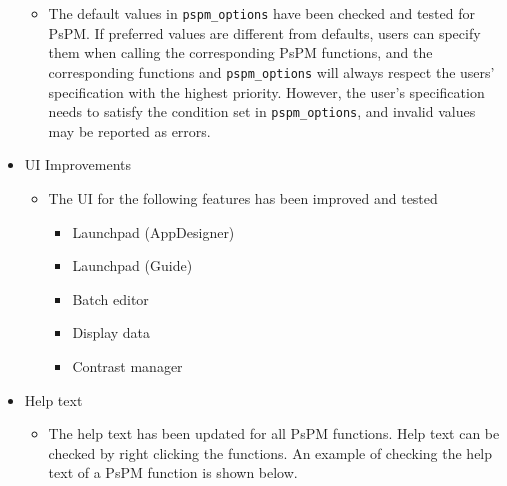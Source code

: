 \documentclass[english]{article}
\numberwithin{equation}{section}
\numberwithin{figure}{section}
\begin{document}
\begin{itemize}
\begin{itemize}
			\item The default values in \texttt{pspm\_options} have been checked and tested for PsPM. If preferred values are different from defaults, users can specify them when calling the corresponding PsPM functions, and the corresponding functions and \texttt{pspm\_options} will always respect the users' specification with the highest priority. However, the user's specification needs to satisfy the condition set in \texttt{pspm\_options}, and invalid values may be reported as errors.
		\end{itemize}
		\item UI Improvements
		\begin{itemize}
			\item The UI for the following features has been improved and tested
			\begin{itemize}
				\item Launchpad (AppDesigner)
				\item Launchpad (Guide)
				\item Batch editor
				\item Display data
				\item Contrast manager
			\end{itemize}
		\end{itemize}
		\item Help text
		\begin{itemize}
			\item The help text has been updated for all PsPM functions. Help text can be checked by right clicking the functions. An example of checking the help text of a PsPM function is shown below.
		\end{itemize}
	\end{itemize}
\end{document}
